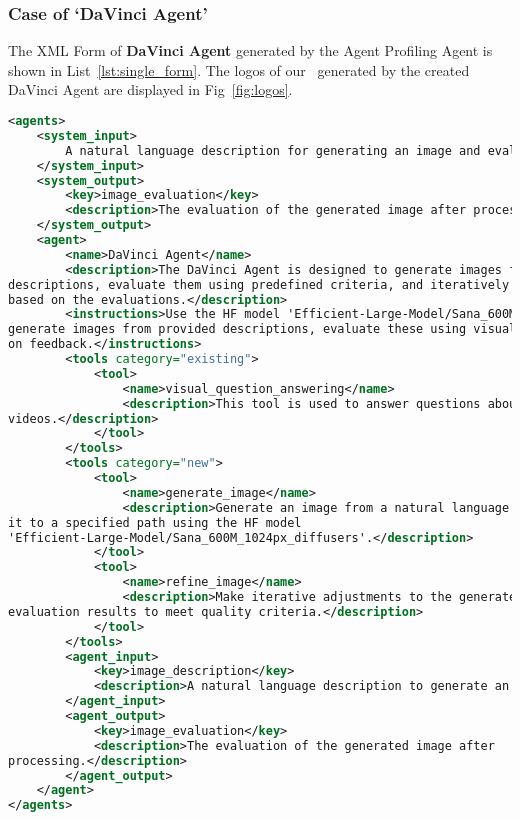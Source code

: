 \subsubsection{Case of `DaVinci Agent'}
The XML Form of \textbf{DaVinci Agent} generated by the Agent Profiling Agent is shown in List~\ref{lst:single_form}. The logos of our \model\ generated by the created DaVinci Agent are displayed in Fig~\ref{fig:logos}.
\begin{lstlisting}[basicstyle=\ttfamily\footnotesize, frame=shadowbox, columns=fullflexible, breaklines=true, breakatwhitespace=true, breakindent=3pt, language=XML, xleftmargin=0.02\linewidth, xrightmargin=0.02\linewidth, caption={AI-generated Creation Profile of \textbf{DaVinci Agent}}, label={lst:single_form}]
<agents>
    <system_input>
        A natural language description for generating an image and evaluating its quality.
    </system_input>
    <system_output>
        <key>image_evaluation</key>
        <description>The evaluation of the generated image after processing.</description>
    </system_output>
    <agent>
        <name>DaVinci Agent</name>
        <description>The DaVinci Agent is designed to generate images from natural language 
descriptions, evaluate them using predefined criteria, and iteratively refine the image 
based on the evaluations.</description>
        <instructions>Use the HF model 'Efficient-Large-Model/Sana_600M_1024px_diffusers' to
generate images from provided descriptions, evaluate these using visual QA, and refine based
on feedback.</instructions>
        <tools category="existing">
            <tool>
                <name>visual_question_answering</name>
                <description>This tool is used to answer questions about attached images or 
videos.</description>
            </tool>
        </tools>
        <tools category="new">
            <tool>
                <name>generate_image</name>
                <description>Generate an image from a natural language description and save 
it to a specified path using the HF model 
'Efficient-Large-Model/Sana_600M_1024px_diffusers'.</description>
            </tool>
            <tool>
                <name>refine_image</name>
                <description>Make iterative adjustments to the generated image based on 
evaluation results to meet quality criteria.</description>
            </tool>
        </tools>
        <agent_input>
            <key>image_description</key>
            <description>A natural language description to generate an image.</description>
        </agent_input>
        <agent_output>
            <key>image_evaluation</key>
            <description>The evaluation of the generated image after 
processing.</description>
        </agent_output>
    </agent>
</agents>
\end{lstlisting}


